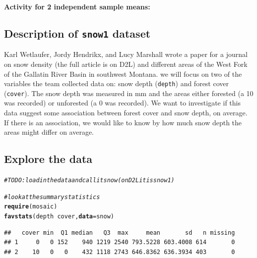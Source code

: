 \documentclass[12pt]{article}\usepackage[]{graphicx}\usepackage[]{color}
\makeatletter
\newcommand{\hlcom}[1]{\textcolor[rgb]{0.4,0.4,0.4}{\textit{#1}}}%
\newcommand{\hlopt}[1]{\textcolor[rgb]{0,0,0}{\textbf{#1}}}%
\newcommand{\hlstd}[1]{\textcolor[rgb]{0,0,0}{#1}}%
\newcommand{\hlkwc}[1]{\textcolor[rgb]{0,0,0}{\textbf{#1}}}%
\newcommand{\hlkwd}[1]{\textcolor[rgb]{0,0,0}{\textbf{#1}}}%
\newenvironment{kframe}{%
 \def\at@end@of@kframe{}%
 \ifinner\ifhmode%
  \def\at@end@of@kframe{\end{minipage}}%
  \begin{minipage}{\columnwidth}%
 \fi\fi%
 \def\FrameCommand##1{\hskip\@totalleftmargin \hskip-\fboxsep
 \colorbox{shadecolor}{##1}\hskip-\fboxsep
     \hskip-\linewidth \hskip-\@totalleftmargin \hskip\columnwidth}%
 \MakeFramed {\advance\hsize-\width
   \@totalleftmargin\z@ \linewidth\hsize
   \@setminipage}}%
 {\par\unskip\endMakeFramed%
 \at@end@of@kframe}
\newenvironment{knitrout}{}{} %
\renewenvironment{knitrout}{\begin{footnotesize}}{\end{footnotesize}}
\makeatother
\begin{document}
\begin{center}
{\Large \bf Activity for 2 independent sample means:} \\
\end{center}



\subsection*{Description of {\tt snow1} dataset}

Karl Wetlaufer, Jordy Hendrikx, and Lucy Marshall wrote a paper for a journal on snow density (the full article is on D2L) and different areas of the West Fork of the Gallatin River Basin in southwest Montana. we will focus on two of the variables the team collected data on: snow depth ({\tt depth}) and forest cover ({\tt cover}). The snow depth was measured in mm and the areas either forested (a 10 was recorded) or unforested (a 0 was recorded). We want to investigate if this data suggest some association between forest cover and snow depth, on average. If there is an association, we would like to know by how much snow depth the areas might differ on average.

\subsection*{Explore the data}


\begin{knitrout}\footnotesize
{}\color{fgcolor}\begin{kframe}
\begin{alltt}
\hlcom{# TODO: load in the data and call it snow (on D2L it is snow1)}

\hlcom{# look at the summary statistics}
\hlkwd{require}\hlstd{(mosaic)}
\hlkwd{favstats}\hlstd{(depth} \hlopt{~} \hlstd{cover,} \hlkwc{data} \hlstd{= snow)}
\end{alltt}
\begin{verbatim}
##   cover min  Q1 median   Q3  max     mean       sd   n missing
## 1     0   0 152    940 1219 2540 793.5228 603.4008 614       0
## 2    10   0   0    432 1118 2743 646.8362 636.3934 403       0
\end{verbatim}
\end{kframe}
\end{knitrout}
\end{document}
